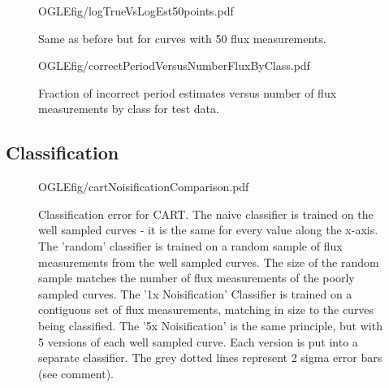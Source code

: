 \documentclass[10pt]{article}
\begin{document}
\begin{figure}[H]
  \begin{center}
    \begin{includegraphics}[height=4in,width=4in]{OGLEfig/logTrueVsLogEst50points.pdf}
      \caption{Same as before but for curves with 50 flux measurements.\label{fig:logTrueVsLogEst50pointsOGLE}}
    \end{includegraphics}
  \end{center}
\end{figure}


\begin{figure}[H]
  \begin{center}
    \begin{includegraphics}[height=4in,width=4in]{OGLEfig/correctPeriodVersusNumberFluxByClass.pdf}
      \caption{Fraction of incorrect period estimates versus number of flux measurements by class for test data.\label{fig:correctPeriodVersusNumberFluxByClass}}
    \end{includegraphics}
  \end{center}
\end{figure}




\subsection{Classification}

\begin{figure}[H]
  \begin{center}
    \begin{includegraphics}[height=4in,width=4in]{OGLEfig/cartNoisificationComparison.pdf}
      \caption{Classification error for CART. The naive classifier is trained on the well sampled curves - it is the same for every value along the x-axis. The 'random' classifier is trained on a random sample of flux measurements from the well sampled curves. The size of the random sample matches the number of flux measurements of the poorly sampled curves. The '1x Noisification' Classifier is trained on a contiguous set of flux measurements, matching in size to the curves being classified. The '5x Noisification' is the same principle, but with 5 versions of each well sampled curve. Each version is put into a separate classifier. The grey dotted lines represent 2 sigma error bars (see comment).\label{fig:cartNoisificationComparisonOGLE}}
    \end{includegraphics}
  \end{center}
\end{figure}
\end{document}

